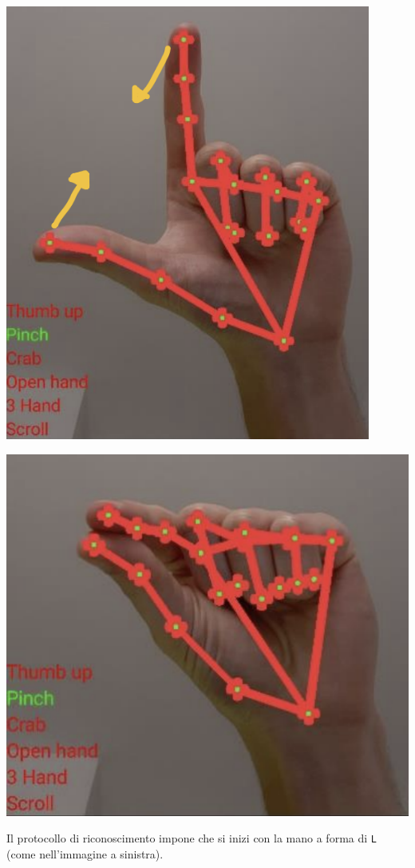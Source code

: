 \begin{multicols}{2}
    \begin{multicolfigure}
        \centering
        \includegraphics[width=0.9\textwidth]{images/pinch_1.png}
    \end{multicolfigure}
    \columnbreak
    \begin{multicolfigure}
        \centering
        \includegraphics[width=1.1\textwidth]{images/pinch_2.png}
    \end{multicolfigure} 
\end{multicols}
\noindent Il protocollo di riconoscimento impone che si inizi con la mano a forma di \texttt{L} (come nell'immagine a sinistra).

